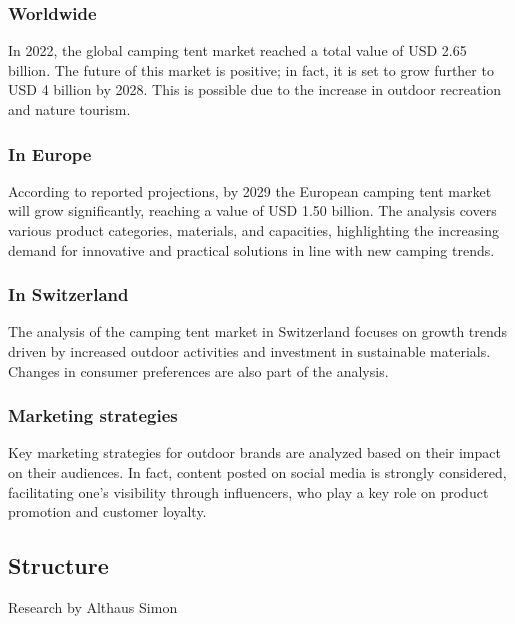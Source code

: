 \documentclass{article}
\begin{document}
\subsubsection{Worldwide}
In 2022, the global camping tent market reached a total value of USD 2.65 billion. The
future of this market is positive; in fact, it is set to grow further to USD 4 billion by
2028. This is possible due to the increase in outdoor recreation and nature tourism.\\


\subsubsection{In Europe}
According to reported projections, by 2029 the European camping tent market will grow
significantly, reaching a value of USD 1.50 billion. The analysis covers various product
categories, materials, and capacities, highlighting the increasing demand for innovative
and practical solutions in line with new camping trends.\\


\subsubsection{In Switzerland}
The analysis of the camping tent market in Switzerland focuses on growth trends driven by
increased outdoor activities and investment in sustainable materials.
Changes in consumer preferences are also part of the analysis.\\


\subsubsection{Marketing strategies}
Key marketing strategies for outdoor brands are analyzed based on their impact on their
audiences. In fact, content posted on social media is strongly considered, facilitating
one's visibility through influencers, who play a key role on product promotion and
customer loyalty.\\


\subsection{Structure}
{\small Research by Althaus Simon}
\end{document}
